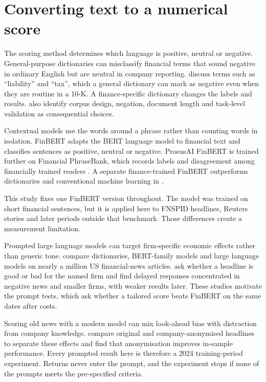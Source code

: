 \section{Converting text to a numerical score}

The scoring method determines which language is positive, neutral or negative.
General-purpose dictionaries can misclassify financial terms that sound
negative in ordinary English but are neutral in company reporting.
\citet{loughran2011liability} discuss terms such as ``liability'' and ``tax'',
which a general dictionary can mark as negative even when they are routine in a
10-K. A finance-specific dictionary changes the labels and results.
\citet{loughran2016} also identify corpus design, negation, document length and
task-level validation as consequential choices.

Contextual models use the words around a phrase rather than counting words in
isolation. FinBERT adapts the BERT language model to financial text and classifies
sentences as positive, neutral or negative. ProsusAI FinBERT is trained further
on Financial PhraseBank, which records labels and disagreement among financially
trained readers \citep{malo2014,araci2019}. A separate finance-trained FinBERT
outperforms dictionaries and conventional machine learning in
\citet{huang2023}.

This study fixes one FinBERT version throughout. The model was trained on short
financial sentences, but it is applied here to FNSPID headlines, Reuters stories
and later periods outside that benchmark. Those differences create a measurement
limitation.

Prompted large language models can target firm-specific economic effects rather
than generic tone. \citet{kirtac2024} compare dictionaries, BERT-family models
and large language models on nearly a million US financial-news articles.
\citet{lopezlira2026} ask whether a headline is good or bad for the named firm
and find delayed responses concentrated in negative news and smaller firms,
with weaker results later. These studies motivate the prompt tests, which ask
whether a tailored score beats FinBERT on the same dates after costs.

Scoring old news with a modern model can mix look-ahead bias with distraction
from company knowledge. \citet{glasserman2023} compare original and
company-anonymised headlines to separate these effects and find that
anonymisation improves in-sample performance. Every prompted result here is
therefore a 2024 training-period experiment. Returns never enter the prompt,
and the experiment stops if none of the prompts meets the pre-specified
criteria.

